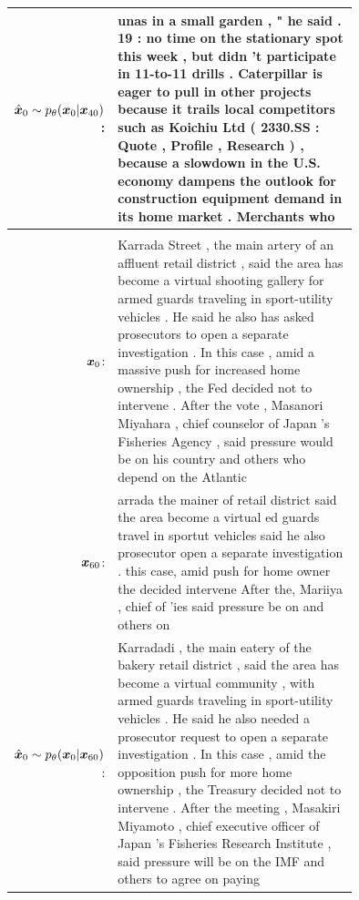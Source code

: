 {\begin{tabular}{rp{0.75\linewidth}}
$\hat{\boldsymbol{x}}_0 \sim p_\theta(\boldsymbol{x}_0 | \boldsymbol{x}_{40})$: &\strut{}unas in a small garden , " he said . 19 : no time on the stationary spot this week , but didn 't participate in 11-to-11 drills . Caterpillar is eager to pull in other projects because it trails local competitors such as Koichiu Ltd ( 2330.SS : Quote , Profile , Research ) , because a slowdown in the U.S. economy dampens the outlook for construction equipment demand in its home market . Merchants who\\
\hline\\
$\boldsymbol{x}_0$: &\strut{}Karrada Street , the main artery of an affluent retail district , said the area has become a virtual shooting gallery for armed guards traveling in sport-utility vehicles . He said he also has asked prosecutors to open a separate investigation . In this case , amid a massive push for increased home ownership , the Fed decided not to intervene . After the vote , Masanori Miyahara , chief counselor of Japan 's Fisheries Agency , said pressure would be on his country and others who depend on the Atlantic\\
$\boldsymbol{x}_{60}$: &\strut{}\smallmasktok{}arrada\smallmasktok{} \smallmasktok{} the main\smallmasktok{}er\smallmasktok{} of\smallmasktok{} \smallmasktok{}\smallmasktok{}\smallmasktok{} retail district \smallmasktok{} said the area\smallmasktok{} become a virtual\smallmasktok{} \smallmasktok{}\smallmasktok{}\smallmasktok{}ed guards travel\smallmasktok{} in sport\smallmasktok{}ut\smallmasktok{} vehicles\smallmasktok{}\smallmasktok{}\smallmasktok{} said he also\smallmasktok{}\smallmasktok{}\smallmasktok{} prosecutor\smallmasktok{}\smallmasktok{} open a separate investigation .\smallmasktok{}\smallmasktok{} this case\smallmasktok{}, amid\smallmasktok{}\smallmasktok{} push for\smallmasktok{} home owner\smallmasktok{}\smallmasktok{}\smallmasktok{} the\smallmasktok{} decided\smallmasktok{}\smallmasktok{} intervene\smallmasktok{} After the\smallmasktok{}\smallmasktok{}, Ma\smallmasktok{}\smallmasktok{}ri\smallmasktok{}iya\smallmasktok{}\smallmasktok{} , chief\smallmasktok{}\smallmasktok{} of\smallmasktok{} '\smallmasktok{}\smallmasktok{}ies\smallmasktok{}\smallmasktok{} \smallmasktok{} said pressure\smallmasktok{} be on\smallmasktok{}\smallmasktok{} and others\smallmasktok{}\smallmasktok{} on\smallmasktok{}\smallmasktok{}\\
$\hat{\boldsymbol{x}}_0 \sim p_\theta(\boldsymbol{x}_0 | \boldsymbol{x}_{60})$: &\strut{}Karradadi , the main eatery of the bakery retail district , said the area has become a virtual community , with armed guards traveling in sport-utility vehicles . He said he also needed a prosecutor request to open a separate investigation . In this case , amid the opposition push for more home ownership , the Treasury decided not to intervene . After the meeting , Masakiri Miyamoto , chief executive officer of Japan 's Fisheries Research Institute , said pressure will be on the IMF and others to agree on paying\\

\end{tabular}}
